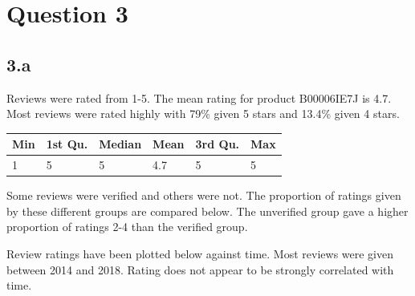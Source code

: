 \documentclass[
  11pt,
]{article}
\begin{document}
\hypertarget{question-3}{%
\section{Question 3}\label{question-3}}

\hypertarget{a-1}{%
\subsection{3.a}\label{a-1}}

Reviews were rated from 1-5. The mean rating for product B00006IE7J is
4.7. Most reviews were rated highly with 79\% given 5 stars and 13.4\%
given 4 stars.

\begin{longtable}[]{@{}llllll@{}}
\toprule
Min & 1st Qu. & Median & Mean & 3rd Qu. & Max \\
\midrule
\endhead
1 & 5 & 5 & 4.7 & 5 & 5 \\
\bottomrule
\end{longtable}

Some reviews were verified and others were not. The proportion of
ratings given by these different groups are compared below. The
unverified group gave a higher proportion of ratings 2-4 than the
verified group.

Review ratings have been plotted below against time. Most reviews were
given between 2014 and 2018. Rating does not appear to be strongly
correlated with time.
\end{document}
